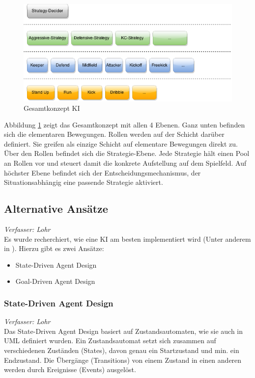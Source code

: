 \documentclass[fontsize=12pt,a4paper,final]{scrartcl}[2003/01/01]
\begin{document}
\begin{figure}[H]
	\centering
	\includegraphics[width=1.0\textwidth]{Grafiken/KI/Ki-Concept}
	\caption{Gesamtkonzept KI}
	\label{Gesamtkonzept KI}
\end{figure}

Abbildung \ref{Gesamtkonzept KI} zeigt das Gesamtkonzept mit allen 4 Ebenen. Ganz unten befinden sich die elementaren Bewegungen. Rollen werden auf der Schicht darüber definiert. Sie greifen als einzige Schicht auf elementare Bewegungen direkt zu. Über den Rollen befindet sich die Strategie-Ebene. Jede Strategie hält einen Pool an Rollen vor und steuert damit die konkrete Aufstellung auf dem Spielfeld. Auf höchster Ebene befindet sich der Entscheidungsmechanismus, der Situationsabhängig eine passende Strategie aktiviert. 
\subsection{Alternative Ansätze}
\textit{Verfasser: Lohr}\\

Es wurde recherchiert, wie eine KI am besten implementiert wird (Unter anderem in \cite{buckland2005programming}). Hierzu gibt es zwei Ansätze:
\begin{itemize}
 \item State-Driven Agent Design
 \item Goal-Driven Agent Design
\end{itemize}

\subsubsection{State-Driven Agent Design}
\textit{Verfasser: Lohr}\\
Das State-Driven Agent Design basiert auf Zustandsautomaten, wie sie auch in UML definiert wurden. Ein Zustandsautomat setzt sich zusammen auf verschiedenen Zuständen (States), davon genau ein Startzustand und min. ein Endzustand. Die Übergänge (Transitions) von einem Zustand in einen anderen werden durch Ereignisse (Events) ausgelöst.
\end{document}
